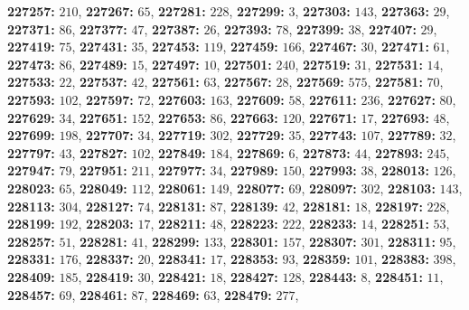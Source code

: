 \textsf{\bfseries 227257:} $210$, \textsf{\bfseries 227267:} $65$, \textsf{\bfseries 227281:} $228$, \textsf{\bfseries 227299:} $3$, \textsf{\bfseries 227303:} $143$, \textsf{\bfseries 227363:} $29$, \textsf{\bfseries 227371:} $86$, \textsf{\bfseries 227377:} $47$, \textsf{\bfseries 227387:} $26$, \textsf{\bfseries 227393:} $78$, \textsf{\bfseries 227399:} $38$, \textsf{\bfseries 227407:} $29$, \textsf{\bfseries 227419:} $75$, \textsf{\bfseries 227431:} $35$, \textsf{\bfseries 227453:} $119$, \textsf{\bfseries 227459:} $166$, \textsf{\bfseries 227467:} $30$, \textsf{\bfseries 227471:} $61$, \textsf{\bfseries 227473:} $86$, \textsf{\bfseries 227489:} $15$, \textsf{\bfseries 227497:} $10$, \textsf{\bfseries 227501:} $240$, \textsf{\bfseries 227519:} $31$, \textsf{\bfseries 227531:} $14$, \textsf{\bfseries 227533:} $22$, \textsf{\bfseries 227537:} $42$, \textsf{\bfseries 227561:} $63$, \textsf{\bfseries 227567:} $28$, \textsf{\bfseries 227569:} $575$, \textsf{\bfseries 227581:} $70$, \textsf{\bfseries 227593:} $102$, \textsf{\bfseries 227597:} $72$, \textsf{\bfseries 227603:} $163$, \textsf{\bfseries 227609:} $58$, \textsf{\bfseries 227611:} $236$, \textsf{\bfseries 227627:} $80$, \textsf{\bfseries 227629:} $34$, \textsf{\bfseries 227651:} $152$, \textsf{\bfseries 227653:} $86$, \textsf{\bfseries 227663:} $120$, \textsf{\bfseries 227671:} $17$, \textsf{\bfseries 227693:} $48$, \textsf{\bfseries 227699:} $198$, \textsf{\bfseries 227707:} $34$, \textsf{\bfseries 227719:} $302$, \textsf{\bfseries 227729:} $35$, \textsf{\bfseries 227743:} $107$, \textsf{\bfseries 227789:} $32$, \textsf{\bfseries 227797:} $43$, \textsf{\bfseries 227827:} $102$, \textsf{\bfseries 227849:} $184$, \textsf{\bfseries 227869:} $6$, \textsf{\bfseries 227873:} $44$, \textsf{\bfseries 227893:} $245$, \textsf{\bfseries 227947:} $79$, \textsf{\bfseries 227951:} $211$, \textsf{\bfseries 227977:} $34$, \textsf{\bfseries 227989:} $150$, \textsf{\bfseries 227993:} $38$, \textsf{\bfseries 228013:} $126$, \textsf{\bfseries 228023:} $65$, \textsf{\bfseries 228049:} $112$, \textsf{\bfseries 228061:} $149$, \textsf{\bfseries 228077:} $69$, \textsf{\bfseries 228097:} $302$, \textsf{\bfseries 228103:} $143$, \textsf{\bfseries 228113:} $304$, \textsf{\bfseries 228127:} $74$, \textsf{\bfseries 228131:} $87$, \textsf{\bfseries 228139:} $42$, \textsf{\bfseries 228181:} $18$, \textsf{\bfseries 228197:} $228$, \textsf{\bfseries 228199:} $192$, \textsf{\bfseries 228203:} $17$, \textsf{\bfseries 228211:} $48$, \textsf{\bfseries 228223:} $222$, \textsf{\bfseries 228233:} $14$, \textsf{\bfseries 228251:} $53$, \textsf{\bfseries 228257:} $51$, \textsf{\bfseries 228281:} $41$, \textsf{\bfseries 228299:} $133$, \textsf{\bfseries 228301:} $157$, \textsf{\bfseries 228307:} $301$, \textsf{\bfseries 228311:} $95$, \textsf{\bfseries 228331:} $176$, \textsf{\bfseries 228337:} $20$, \textsf{\bfseries 228341:} $17$, \textsf{\bfseries 228353:} $93$, \textsf{\bfseries 228359:} $101$, \textsf{\bfseries 228383:} $398$, \textsf{\bfseries 228409:} $185$, \textsf{\bfseries 228419:} $30$, \textsf{\bfseries 228421:} $18$, \textsf{\bfseries 228427:} $128$, \textsf{\bfseries 228443:} $8$, \textsf{\bfseries 228451:} $11$, \textsf{\bfseries 228457:} $69$, \textsf{\bfseries 228461:} $87$, \textsf{\bfseries 228469:} $63$, \textsf{\bfseries 228479:} $277$, 
